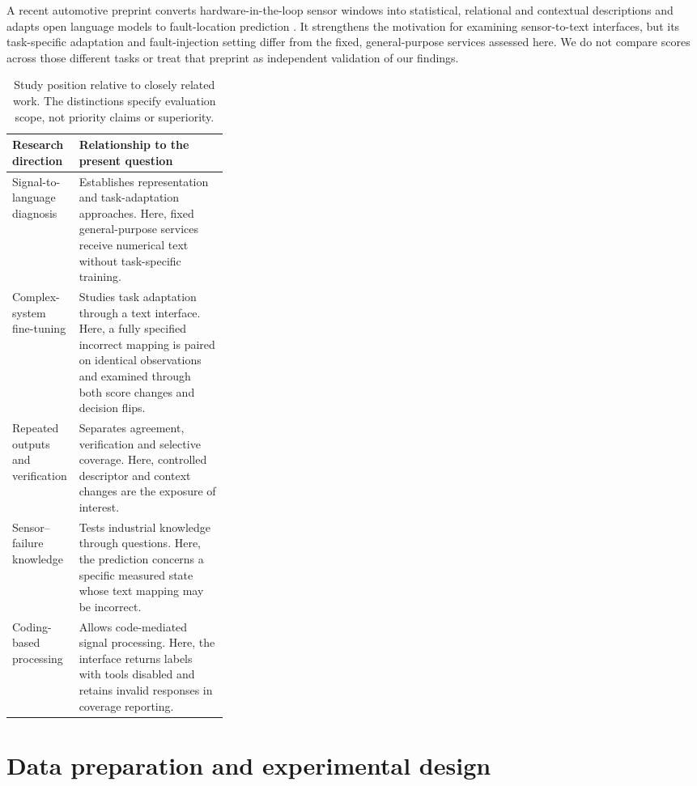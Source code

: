 \documentclass[11pt,a4paper]{article}
\begin{document}
A recent automotive preprint converts hardware-in-the-loop sensor windows into statistical, relational and contextual descriptions and adapts open language models to fault-location prediction \citep{abboush2026sensor}. It strengthens the motivation for examining sensor-to-text interfaces, but its task-specific adaptation and fault-injection setting differ from the fixed, general-purpose services assessed here. We do not compare scores across those different tasks or treat that preprint as independent validation of our findings.

\begin{table}[htbp]
\centering\small
\caption{Study position relative to closely related work. The distinctions specify evaluation scope, not priority claims or superiority.}
\label{tab:position}
\begin{tabularx}{\linewidth}{@{}>{\raggedright\arraybackslash}p{0.31\linewidth}>{\raggedright\arraybackslash}X@{}}
\toprule
Research direction & Relationship to the present question \\
\midrule
Signal-to-language diagnosis \citep{qaid2026explainable} & Establishes representation and task-adaptation approaches. Here, fixed general-purpose services receive numerical text without task-specific training. \\
Complex-system fine-tuning \citep{zheng2024empirical} & Studies task adaptation through a text interface. Here, a fully specified incorrect mapping is paired on identical observations and examined through both score changes and decision flips. \\
Repeated outputs and verification \citep{kiangala2026verification} & Separates agreement, verification and selective coverage. Here, controlled descriptor and context changes are the exposure of interest. \\
Sensor--failure knowledge \citep{constantinides2025failuresensoriq} & Tests industrial knowledge through questions. Here, the prediction concerns a specific measured state whose text mapping may be incorrect. \\
Coding-based processing \citep{sensorbench2025} & Allows code-mediated signal processing. Here, the interface returns labels with tools disabled and retains invalid responses in coverage reporting. \\
\bottomrule
\end{tabularx}
\end{table}

\section{Data preparation and experimental design}
\end{document}

